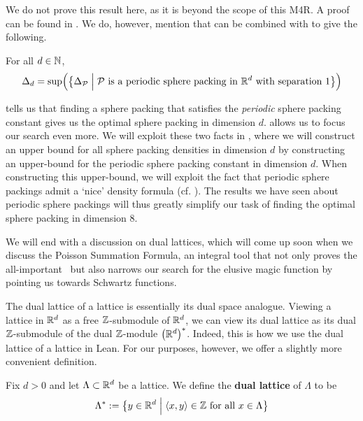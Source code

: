 We do not prove this result here, as it is beyond the scope of this M4R. A proof can be found in \cite[Appendix A]{CohnElkies}. We do, however, mention that  can be combined with  to give the following.

\begin{boxproposition}\label{Ch2:Prop:Scaling_Periodic_Constant}
    For all $d \in \mathbb{N}$,
    \begin{align*}
        \Delta_{d} = \sup\!\left( {\left\{ \Delta_{\mathcal{P}} \; \middle\vert \; \mathcal{P} \text{ is a periodic sphere packing in } \mathbb{R}^d \text{ with separation } 1 \right\}} \right)
    \end{align*}
\end{boxproposition}

 tells us that finding a sphere packing that satisfies the \textit{periodic} sphere packing constant gives us the optimal sphere packing in dimension $d$.  allows us to focus our search even more. We will exploit these two facts in , where we will construct an upper bound for all sphere packing densities in dimension $d$ by constructing an upper-bound for the periodic sphere packing constant in dimension $d$. When constructing this upper-bound, we will exploit the fact that periodic sphere packings admit a `nice' density formula (cf. ). The results we have seen about periodic sphere packings will thus greatly simplify our task of finding the optimal sphere packing in dimension $8$.

We will end with a discussion on dual lattices, which will come up soon when we discuss the Poisson Summation Formula, an integral tool that not only proves the all-important \CELP\ but also narrows our search for the elusive magic function by pointing us towards Schwartz functions.

The dual lattice of a lattice is essentially its dual space analogue. Viewing a lattice in $\mathbb{R}^d$ as a free $\mathbb{Z}$-submodule of $\mathbb{R}^d$, we can view its dual lattice as its dual $\mathbb{Z}$-submodule of the dual $\mathbb{Z}$-module $\left( \mathbb{R}^d \right)^*$. Indeed, this is how we use the dual lattice of a lattice in Lean. For our purposes, however, we offer a slightly more convenient definition.

\begin{boxdefinition}\label{Ch2:Def:Dual_Lattice}
    Fix $d > 0$ and let $\Lambda \subset \mathbb{R}^d$ be a lattice. We define the \textbf{dual lattice} of $\Lambda$ to be
    \begin{align*}
        \Lambda^* := \left\{ y \in \mathbb{R}^d \; \middle\vert \; \left\langle x, y \right\rangle \in \mathbb{Z} \text{ for all } x \in \Lambda \right\}
    \end{align*}
\end{boxdefinition}

